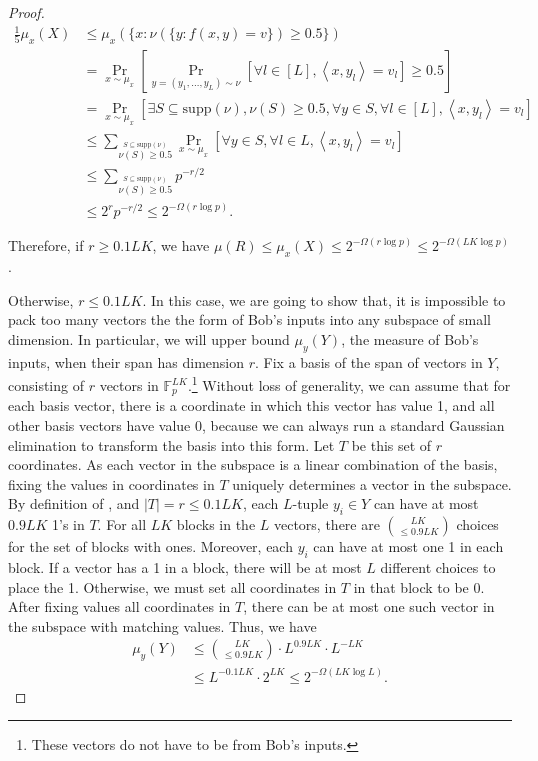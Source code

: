 \documentclass[11pt]{article}
\begin{document}
{\begin{proof}
\[
	\begin{aligned}
		\frac{1}{5}\mu_x(X)&\leq \mu_x\left(\{x:\nu(\{y:f(x,y)=v\})\geq 0.5\}\right) \\
		&=\Pr_{x\sim \mu_x}\left[\Pr_{y=(y_1,\ldots,y_L)\sim \nu}\left[\forall l\in [L],\left<x,y_l\right>=v_l\right]\geq 0.5\right]\\
		&=\Pr_{x\sim \mu_x}\left[\exists S\subseteq \mathrm{supp}(\nu),\nu(S)\geq 0.5,\forall y\in S,\forall l\in [L],\left<x,y_l\right>=v_l\right]\\
		&\leq \sum_{\stackrel{S\subseteq \mathrm{supp}(\nu)}{\nu(S)\geq 0.5}}\Pr_{x\sim \mu_x}\left[\forall y\in S,\forall l\in L,\left<x,y_l\right>=v_l\right] \\
		&\leq \sum_{\stackrel{S\subseteq \mathrm{supp}(\nu)}{\nu(S)\geq 0.5}}p^{-r/2} \\
		&\leq 2^r p^{-r/2}\leq 2^{-\Omega(r\log p)}.
	\end{aligned}
\]

Therefore, if $r\geq 0.1LK$, we have $\mu(R)\leq \mu_x(X)\leq 2^{-\Omega(r\log p)}\leq 2^{-\Omega(LK\log p)}$. 

Otherwise, $r\leq 0.1LK$. In this case, we are going to show that, it is impossible to pack too many vectors the the form of Bob's inputs into any subspace of small dimension. In particular, we will upper bound $\mu_y(Y)$, the measure of Bob's \es{} inputs, when their span has dimension $r$. Fix a basis of the span of vectors in $Y$, consisting of $r$ vectors in $\mathbb{F}_p^{LK}$.\footnote{These vectors do not have to be from Bob's inputs.} Without loss of generality, we can assume that for each basis vector, there is a coordinate in which this vector has value 1, and all other basis vectors have value 0, because we can always run a standard Gaussian elimination to transform the basis into this form. Let $T$ be this set of $r$ coordinates. As each vector in the subspace is a linear combination of the basis, fixing the values in coordinates in $T$ uniquely determines a vector in the subspace. By definition of \es{}, and $|T|=r\leq 0.1LK$, each $L$-tuple $y_i\in Y$ can have at most $0.9LK$ 1's in $T$. For all $LK$ blocks in the $L$ vectors, there are ${LK\choose \leq 0.9LK}$ choices for the set of blocks with ones. Moreover, each $y_i$ can have at most one 1 in each block. If a vector has a 1 in a block, there will be at most $L$ different choices to place the 1. Otherwise, we must set all coordinates in $T$ in that block to be $0$. After fixing values all coordinates in $T$, there can be at most one such vector in the subspace with matching values. Thus, we have
\[
	\begin{aligned}
	\mu_y(Y)&\leq {LK\choose \leq 0.9LK}\cdot L^{0.9LK}\cdot L^{-LK}\\
	&\leq L^{-0.1LK}\cdot 2^{LK}\leq 2^{-\Omega(LK\log L)}.
	\end{aligned}
\]


\end{proof}}
\end{document}
